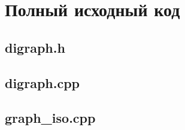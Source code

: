 \chapter{Полный исходный код}

\section{digraph.h}


\section{digraph.cpp}


\section{graph\_iso.cpp}

